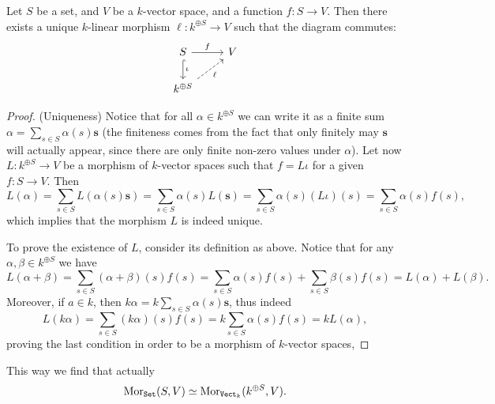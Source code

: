 \begin{proposition}
    \label{prop: universal property free vs}
    Let \(S\) be a set, and \(V\) be a \(k\)-vector space, and a function \(f : S
    \to V\). Then there exists a unique \(k\)-linear morphism \(\ell : k^{\oplus
            S} \to V\) such that the diagram commutes:
    \[
        \begin{tikzcd}
            S \ar[r, "f"] \ar[d, hook, "\iota"] &V \\
            k^{\oplus S} \ar[ru, dashed, swap, "\ell"]
        \end{tikzcd}
    \]
\end{proposition}

\begin{proof}
    (Uniqueness) Notice that for all \(\alpha \in k^{\oplus S}\) we can write it
    as a finite sum \(\alpha = \sum_{s \in S}\alpha(s) \mathbf s\) (the
    finiteness comes from the fact that only finitely may \(\mathbf s\) will
    actually appear, since there are only finite non-zero values under
    \(\alpha\)). Let now  \(L : k^{\oplus S} \to V\) be a morphism of
    \(k\)-vector spaces such that \(f = L  \iota\) for a given \(f : S \to
    V\). Then
    \[
        L(\alpha) = \sum_{s \in S} L(\alpha(s) \mathbf{s}) = \sum_{s \in S}
        \alpha(s) L(\mathbf s) = \sum_{s \in S} \alpha(s) (L  \iota)(s)
        = \sum_{s \in S} \alpha(s) f(s),
    \]
    which implies that the morphism \(L\) is indeed unique.

    To prove the existence of \(L\), consider its definition as above. Notice
    that for any \(\alpha, \beta \in k^{\oplus S}\) we have
    \[
        L(\alpha + \beta) = \sum_{s \in S} (\alpha + \beta)(s) f(s) = \sum_{s \in
            S} \alpha(s)f(s) + \sum_{s \in S} \beta(s)f(s) = L(\alpha) + L(\beta).
    \]
    Moreover, if \(a \in k\), then \(k \alpha = k\sum_{s \in S} \alpha(s)
    \mathbf s\), thus indeed
    \[
        L(k \alpha) = \sum_{s \in S} (k \alpha)(s) f(s) = k \sum_{s \in S}
        \alpha(s) f(s) = k L(\alpha),
    \]
    proving the last condition in order to be a morphism of \(k\)-vector spaces,
\end{proof}

This way we find that actually
\[
    \operatorname{Mor}_{{\texttt{Set}}}(S, V) \simeq \operatorname{Mor}_{{\texttt{Vect}}_k}(k^{\oplus S}, V).
\]

